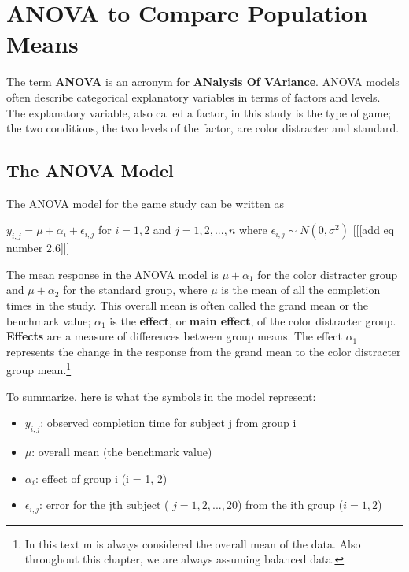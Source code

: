 \documentclass[
]{report}
\providecommand{\tightlist}{%
  \setlength{\itemsep}{0pt}\setlength{\parskip}{0pt}}
\begin{document}
\newpage

\section{ANOVA to Compare Population Means}\label{anova-to-compare-population-means}

The term \textbf{ANOVA} is an acronym for \textbf{ANalysis Of VAriance}. ANOVA models often describe categorical explanatory variables in terms of factors and levels. The explanatory variable, also called a factor, in
this study is the type of game; the two conditions, the two levels of the factor, are color distracter and standard.

\subsection{The ANOVA Model}\label{the-anova-model}

The ANOVA model for the game study can be written as

\(y_{i,j} = \mu + \alpha_i + \epsilon_{i,j}\) for \(i = 1, 2\) and \(j = 1, 2, ... , n\) where \(\epsilon_{i,j} \sim N(0,\sigma^2)\)
{[}{[}{[}add eq number 2.6{]}{]}{]}

The mean response in the ANOVA model is \(\mu + \alpha_1\) for the color distracter group and \(\mu + \alpha_2\) for the standard group, where \(\mu\) is the mean of all the completion times in the study. This overall mean is often called the grand mean or the benchmark value; \(\alpha_1\) is the \textbf{effect}, or \textbf{main effect}, of the color distracter group. \textbf{Effects} are a measure of differences between group means. The effect \(\alpha_1\) represents the change in the response from the grand mean to the color distracter group mean.\footnote{In this text m is always considered the overall mean of the data. Also throughout this chapter, we are always assuming balanced data.}

To summarize, here is what the symbols in the model represent:

\begin{itemize}
\tightlist
\item
  \(y_{i,j}\): observed completion time for subject j from group i
\item
  \(\mu\): overall mean (the benchmark value)
\item
  \(\alpha_i\): effect of group i (i = 1, 2)
\item
  \(\epsilon_{i,j}\): error for the jth subject ( \(j = 1, 2, ... , 20\)) from the ith group (\(i = 1, 2\))
\end{itemize}
\end{document}
